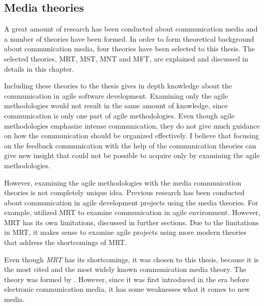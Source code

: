 \documentclass[english,12pt,a4paper,pdftex]{article}
\begin{document}
\subsection{Media theories}
\label{sec:media_theories}

A great amount of research has been conducted about communication media and a number of theories have been formed. In order to form theoretical background about communication media, four theories have been selected to this thesis. The selected theories, \acl{MRT}, \acl{MST}, \acl{MNT} and \acl{MFT}, are explained and discussed in details in this chapter.

Including these theories to the thesis gives in depth knowledge about the communication in agile software development. Examining only the agile methodologies would not result in the same amount of knowledge, since communication is only one part of agile methodologies. Even though agile methodologies emphasize intense communication, they do not give much guidance on how the communication should be organized effectively. I believe that focusing on the feedback communication with the help of the communication theories can give new insight that could not be possible to acquire only by examining the agile methodologies.

However, examining the agile methodologies with the media communication theories is not completely unique idea. Previous research has been conducted about communication in agile development projects using the media theories. For example, \citet{korkala2006} utilized \ac{MRT} to examine communication in agile environment. However, \ac{MRT} has its own limitations, discussed in further sections. Due to the limitations in \ac{MRT}, it makes sense to examine agile projects using more modern theories that address the shortcomings of \ac{MRT}.

Even though \emph{\acl{MRT}} has its shortcomings, it was chosen to this thesis, because it is the most cited and the most widely known communication media theory. The theory was formed by \citet{daft1986}. However, since it was first introduced in the era before electronic communication media, it has some weaknesses what it comes to new media.
\end{document}
